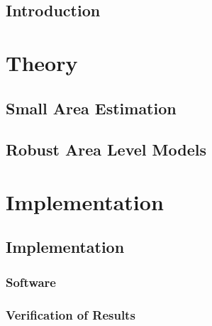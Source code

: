 % 

\chapter{Introduction}



\part{Theory}\label{part:theory}

\chapter{Small Area Estimation}









\chapter{Robust Area Level Models}








\part{Implementation}\label{part:implementation}

\chapter{Implementation}\label{part:implementation}

\section{Software}
\section{Verification of Results}
